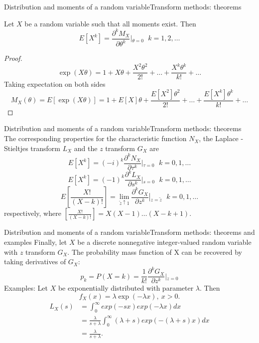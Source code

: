 \documentclass[handout]{beamer}
\begin{document}
\begin{frame}{Distribution and moments of a random variable}{Transform methods: theorems}
\begin{theorem}
Let $X$ be a random variable such that all moments exist. Then
\[
 E\left[ X^k \right] = \frac{\partial^k M_X}{\partial \theta ^k} \left \vert _ {\theta=0} \right. \, \ \ k=1,2, \dots
\]

\end{theorem}

\begin{proof}
\[
 \exp(X\theta) = 1+X\theta + \frac{X^2\theta^2}{2!} + \dots +\frac{X^k\theta^k}{k!} + \dots
\]
Taking expectation on both sides
\[
 M_X(\theta) = E\left[  \exp(X\theta) \right] = 1 + E\left[X\right]\theta + \frac{E\left[X^2\right]\theta^2}{2!} + \dots + 
 \frac{E\left[X^k\right]\theta^k}{k!} + \dots
\]
\end{proof}
\end{frame}

\begin{frame}{Distribution and moments of a random variable}{Transform methods: theorems}
The corresponding properties for the characteristic function $N_X$, the Laplace - Stieltjes transform $L_X$ and the $z$ 
transform $G_X$ are
\[
  E\left[ X^k \right] = (-i)^k \frac{\partial^k N_X}{\partial \tau ^k} \left \vert _ {\tau=0} \right.  \, \ \ k=0,1, \dots
\]
\[
 E\left[ X^k \right] = (-1)^k \frac{\partial^k L_X}{\partial s ^k} \left \vert _ {s=0} \right.  \, \ \ k=0,1, \dots
\]
\[
 E\left[\frac{X!}{(X-k)!} \right] = \lim_{\tilde z\uparrow 1} \frac{\partial^k G_X}{\partial z ^k} \left \vert _ {z=\tilde z} \right. \, \ \ k=0,1, \dots
\]
respectively, where $\left[\frac{X!}{(X-k)!} \right] = X (X-1) \dots (X-k+1)$.
\end{frame}

\begin{frame}{Distribution and moments of a random variable}{Transform methods: theorems and examples}
Finally, let $X$ be a discrete nonnegative integer-valued random variable with $z$ transform $G_X$.
The probability mass function of X can be recovered by taking derivatives of $G_X$:
\[
 p_k = P(X=k) = \frac{1}{k!}\frac{\partial^k G_X}{\partial z ^k} \left \vert _ {z=0} \right.
\]
Examples:
Let $X$ be exponentially distributed with parameter $\lambda$. Then
\[
 f_X(x)=\lambda \exp(-\lambda x), \ x>0.
\]
\begin{align*}
 L_X(s) &= \int_0^\infty exp(-sx)exp(-\lambda x) dx\\
   &= \frac{\lambda}{s+\lambda} \int_0^\infty (\lambda+s)exp(-(\lambda+s) x) dx \\
   &= \frac{\lambda}{s+\lambda}.
\end{align*}
\end{frame}
\end{document}
